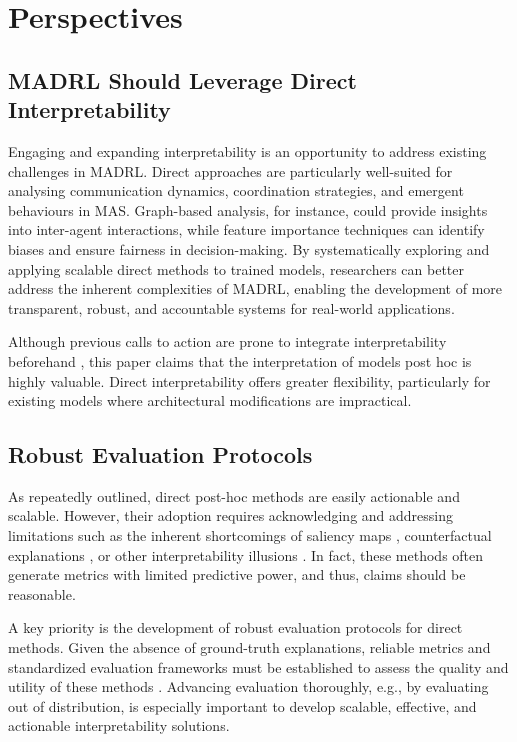 \section{Perspectives}

\subsection{MADRL Should Leverage Direct Interpretability}

Engaging and expanding interpretability is an opportunity to address existing challenges in MADRL. Direct approaches are particularly well-suited for analysing communication dynamics, coordination strategies, and emergent behaviours in MAS. Graph-based analysis, for instance, could provide insights into inter-agent interactions, while feature importance techniques can identify biases and ensure fairness in decision-making. By systematically exploring and applying scalable direct methods to trained models, researchers can better address the inherent complexities of MADRL, enabling the development of more transparent, robust, and accountable systems for real-world applications.

Although previous calls to action are prone to integrate interpretability beforehand \cite{rodriguez2024explainable}, this paper claims that the interpretation of models post hoc is highly valuable. Direct interpretability offers greater flexibility, particularly for existing models where architectural modifications are impractical. 

\subsection{Robust Evaluation Protocols}

As repeatedly outlined, direct post-hoc methods are easily actionable and scalable.
However, their adoption requires acknowledging and addressing limitations such as the inherent shortcomings of saliency maps \cite{Adebayo2018SanityCF,Bilodeau2022ImpossibilityTF}, counterfactual explanations \cite{Laugel2019TheDO}, or other interpretability illusions \cite{Bolukbasi2021AnII,Friedman2023InterpretabilityII,Friedman2023InterpretabilityII}. In fact, these methods often generate metrics with limited predictive power, and thus, claims should be reasonable.


A key priority is the development of robust evaluation protocols for direct methods. Given the absence of ground-truth explanations, reliable metrics and standardized evaluation frameworks must be established to assess the quality and utility of these methods \cite{Gill2020ARM,Madsen2021PosthocIF,Amorim2023EvaluatingPI,Hedstrm2022QuantusAE,Wei2024RevisitingTR,Huang2024RAVELEI,Chaudhary2024EvaluatingOS}. 
Advancing evaluation thoroughly, e.g., by evaluating out of distribution, is especially important to develop scalable, effective, and actionable interpretability solutions.
